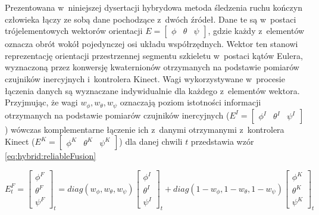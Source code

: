 

Prezentowana w~niniejszej dysertacji hybrydowa metoda śledzenia ruchu kończyn człowieka łączy ze sobą dane pochodzące z~dwóch źródeł. Dane te są w~postaci trójelementowych wektorów orientacji $E = \begin{bmatrix} \phi &  \theta & \psi \end{bmatrix}$, gdzie każdy z~elementów oznacza obrót wokół pojedynczej osi układu współrzędnych. Wektor ten stanowi reprezentację orientacji przestrzennej segmentu szkieletu w~postaci kątów Eulera, wyznaczoną przez konwersję kwaternionów otrzymanych na podstawie pomiarów czujników inercyjnych i~kontrolera Kinect. Wagi wykorzystywane w~procesie łączenia danych są wyznaczane indywidualnie dla każdego z~elementów wektora. Przyjmując, że wagi $w_\phi , w_\theta , w_\psi$ oznaczają poziom istotności informacji otrzymanych na podstawie pomiarów czujników inercyjnych ($E^I = \begin{bmatrix}  \phi^I &  \theta^I &  \psi^I \end{bmatrix}$) wówczas komplementarne łączenie ich z~danymi otrzymanymi z~kontrolera Kinect ($E^K = \begin{bmatrix}  \phi^K &  \theta^K &  \psi^K \end{bmatrix}$) dla danej chwili $t$ przedstawia wzór \ref{eq:hybrid:reliableFusion}

\begin{equation} E^F_t = 
	\begin{bmatrix}  \phi^F \\  \theta^F \\  \psi^F \end{bmatrix}_t = 
	diag(w_\phi,w_\theta,w_\psi)
	\begin{bmatrix}  \phi^I \\  \theta^I \\  \psi^I \end{bmatrix}_t + 
	diag(1-w_\phi,1-w_\theta,1-w_\psi)
	\begin{bmatrix}  \phi^K \\  \theta^K \\  \psi^K \end{bmatrix}_t
	\label{eq:hybrid:reliableFusion}
\end{equation}

